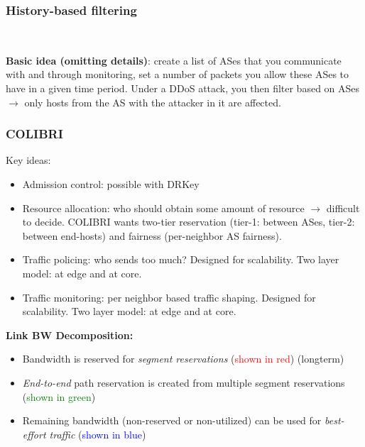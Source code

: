 \documentclass[11pt,oneside,a4paper]{article}
\begin{document}
\subsubsection{History-based filtering}\

\textbf{Basic idea (omitting details)}: create a list of ASes that you communicate with and through monitoring, set a number of packets you allow these ASes to have in a given time period. Under a DDoS attack, you then filter based on ASes $\rightarrow$ only hosts from the AS with the attacker in it are affected.

\newpage

\subsubsection{COLIBRI}

Key ideas:

\vspace{-\topsep}
\begin{itemize}
	\setlength{\itemsep}{0pt}
	\setlength{\parskip}{0pt}
	\item Admission control: possible with DRKey
	\item Resource allocation: who should obtain some amount of resource $\rightarrow$ difficult to decide. COLIBRI wants two-tier reservation (tier-1: between ASes, tier-2: between end-hosts) and fairness (per-neighbor AS fairness).
	\item Traffic policing: who sends too much? Designed for scalability. Two layer model: at edge and at core.
	\item Traffic monitoring: per neighbor based traffic shaping. Designed for scalability. Two layer model: at edge and at core.
\end{itemize}
\vspace{-\topsep}

\textbf{Link BW Decomposition:}

\vspace{-\topsep}
\begin{itemize}
	\setlength{\itemsep}{0pt}
	\setlength{\parskip}{0pt}
	\item Bandwidth is reserved for \textit{segment reservations} (\textcolor{red}{shown in red}) (longterm)
	\item \textit{End-to-end} path reservation is created from multiple segment reservations \\
	(\textcolor{green}{shown in green})
	\item Remaining bandwidth (non-reserved or non-utilized) can be used for \textit{best-effort traffic} (\textcolor{blue}{shown in blue})
\end{itemize}
\vspace{-\topsep}
\end{document}
